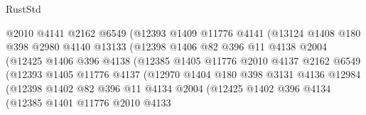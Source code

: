 \begin{lexlean}{RustStd}
\begin{coremodule}
                            @2010
                            @4141
                            @2162
                            @6549
                            (@12393
                              @1409
                              @11776
                              @4141
                              (@13124
                                @1408
                                @180
                                @398
                                @2980
                                @4140
                                @13133
                                (@12398
                                  @1406
                                  @82
                                  @396
                                  @11
                                  @4138
                                  @2004
                                  (@12425
                                    @1406
                                    @396
                                    @4138
                                    (@12385
                                      @1405
                                      @11776
                                      @2010
                                      @4137
                                      @2162
                                      @6549
                                      (@12393
                                        @1405
                                        @11776
                                        @4137
                                        (@12970
                                          @1404
                                          @180
                                          @398
                                          @3131
                                          @4136
                                          @12984
                                          (@12398
                                            @1402
                                            @82
                                            @396
                                            @11
                                            @4134
                                            @2004
                                            (@12425
                                              @1402
                                              @396
                                              @4134
                                              (@12385
                                                @1401
                                                @11776
                                                @2010
                                                @4133

\end{coremodule}
\end{lexlean}
